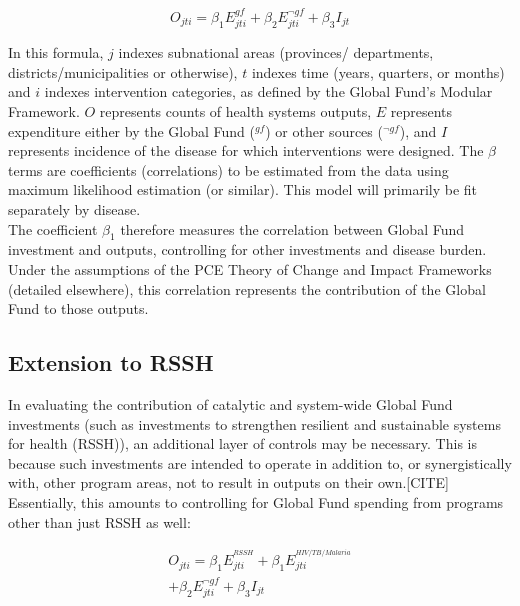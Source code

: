 \documentclass[twocolumn]{bmcart}%
\begin{document}
\begin{equation} \label{basic_model}
O_{jti} = \beta_1 E^{gf}_{jti} + \beta_2 E^{\neg gf}_{jti} + \beta_3 I_{jt}
\end{equation}

In this formula, $j$ indexes subnational areas (provinces/ departments, districts/municipalities or otherwise), $t$ indexes time (years, quarters, or months) and $i$ indexes intervention categories, as defined by the Global Fund's Modular Framework. $O$ represents counts of health systems outputs, $E$ represents expenditure either by the Global Fund ($^{gf}$) or other sources ($^{\neg gf}$), and $I$ represents incidence of the disease for which interventions were designed. The $\beta$ terms are coefficients (correlations) to be estimated from the data using maximum likelihood estimation (or similar). This model will primarily be fit separately by disease.\\

The coefficient $\beta_1$ therefore measures the correlation between Global Fund investment and outputs, controlling for other investments and disease burden. Under the assumptions of the PCE Theory of Change and Impact Frameworks (detailed elsewhere), this correlation represents the contribution of the Global Fund to those outputs.

\subsection{Extension to RSSH}
In evaluating the contribution of catalytic and system-wide Global Fund investments (such as investments to strengthen resilient and sustainable systems for health (RSSH)), an additional layer of controls may be necessary. This is because such investments are intended to operate in addition to, or synergistically with, other program areas, not to result in outputs on their own.[CITE] %
 Essentially, this amounts to controlling for Global Fund spending from programs other than just RSSH as well:

  \begin{align}
    O_{jti} = \beta_1 E^{^{RSSH}}_{jti} + \beta_1 E^{^{HIV/TB/Malaria}}_{jti} \\
    + \beta_2 E^{\neg gf}_{jti} + \beta_3 I_{jt}
  \end{align}
\end{document}
